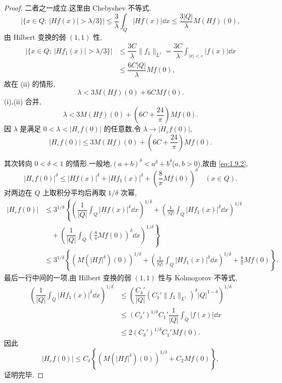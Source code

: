 \begin{proof}
二者之一成立.这里由 Chebyshev 不等式,
\begin{equation*}
|\{x \in Q;\ |Hf(x)| > \lambda/3\}| \leq \frac{3}{\lambda}\int_{Q}|Hf(x)|\dd x \leq \frac{3|Q|}{\lambda}M(Hf)(0),
\end{equation*}
由 Hilbert 变换的弱 $(1,1)$ 性,
\begin{align*}
|\{x \in Q;\ |Hf_{1}(x)| > \lambda/3\}| & \leq \dfrac{3C}{\lambda}\| f_{1} \|_{L^{1}} = \dfrac{3C}{\lambda}\int_{|x| < \varepsilon}|f(x)|\dd x \\
& \leq \dfrac{6C|Q|}{\lambda}Mf(0),
\end{align*}
故在 (ii) 的情形,
\begin{equation*}
\lambda < 3M(Hf)(0) + 6CMf(0).
\end{equation*}
(i),(ii) 合并,
\begin{equation*}
\lambda < 3M(Hf)(0) + \left(6C + \frac{24}{\pi}\right)Mf(0).
\end{equation*}
因 $\lambda$ 是满足 $0 < \lambda < |H_{\varepsilon}f(0)|$ 的任意数,令 $\lambda \to |H_{\varepsilon}f(0)|$,
\begin{equation*}
|H_{\varepsilon}f(0)| \leq 3M(Hf)(0) + \left(6C + \frac{24}{\pi}\right)Mf(0).
\end{equation*}

其次转向 $0 < \delta < 1$ 的情形.一般地,$(a + b)^{\delta} < a^{\delta} + b^{\delta}$($a, b > 0$),故由 \eqref{eq:1.9.2},
\begin{equation*}
|H_{\varepsilon}f(0)|^{\delta} \leq |Hf(x)|^{\delta} + |Hf_{1}(x)|^{\delta} + \left(\frac{8}{\pi}Mf(0)\right)^{\delta} \quad (x \in Q).
\end{equation*}
对两边在 $Q$ 上取积分平均后再取 $1/\delta$ 次幂,
\begin{align*}
|H_{\varepsilon}f(0)|&\leq 3^{1/\delta}\left\{\left(\dfrac{1}{|Q|}\displaystyle\int_{Q}|Hf(x)|^{\delta}\dd x\right)^{1/\delta} + \left(\frac{1}{|Q|}\int_{Q}|Hf_{1}(x)|^{\delta}\dd x\right)^{1/\delta}\right. \\
&\quad + \left.\left(\dfrac{1}{|Q|}\displaystyle\int_{Q}\left(\frac{8}{\pi}Mf(0)\right)^{\delta}\dd x\right)^{1/\delta}\right\}  \\
&\leq 3^{1/\delta}\left\{\left(M\left(|Hf|^{\delta}\right)(0)\right)^{1/\delta} + \left(\frac{1}{|Q|}\int_{Q}|Hf_{1}(x)|^{\delta}\dd x\right)^{1/\delta} + \frac{8}{\pi}Mf(0)\right\}.
\end{align*}
最后一行中间的一项,由 Hilbert 变换的弱 $(1,1)$ 性与 Kolmogorov 不等式,
\begin{align*}
\left(\dfrac{1}{|Q|}\displaystyle\int_{Q}|Hf_{1}(x)|^{\delta}\dd x\right)^{1/\delta} & \leq \left(\dfrac{C_{\delta}'}{|Q|}\left(C_{1}'\| f_{1} \|_{L^{1}}\right)^{\delta}|Q|^{1-\delta}\right)^{1/\delta} \\
& \leq (C_{\delta}')^{1/\delta}C_{1}'\dfrac{1}{|Q|}\int_{\tilde{Q}}|f(x)|\dd x \\
& \leq 2(C_{\delta}')^{1/\delta}C_{1}'Mf(0).
\end{align*}
因此
\begin{equation*}
|H_{\varepsilon}f(0)| \leq C_{\delta}\left\{\left(M\left(|Hf|^{\delta}\right)(0)\right)^{1/\delta} + C_{2}Mf(0)\right\},
\end{equation*}
证明完毕.
\end{proof}
